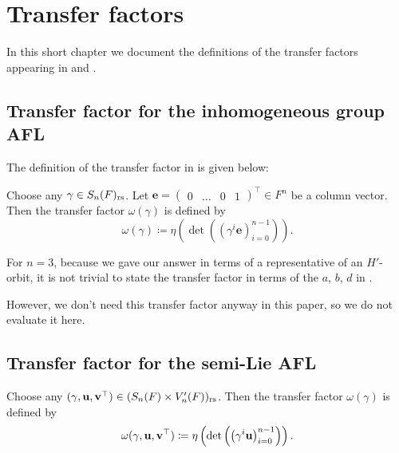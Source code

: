 \section{Transfer factors}
\label{ch:transf}

In this short chapter we document the definitions of the transfer
factors appearing in  and .

\subsection{Transfer factor for the inhomogeneous group AFL}
The definition of the transfer factor in  is given below:
\begin{definition}
  Choose any $\gamma \in S_n(F)_{\mathrm{rs}}$.
  Let $\mathbf{e} = \begin{pmatrix} 0 & \dots & 0 & 1 \end{pmatrix}^\top \in F^n$
  be a column vector.
  Then the transfer factor $\omega(\gamma)$ is defined by
  \[ \omega(\gamma) \coloneqq
    \eta\left( \det\left( \left( \gamma^i \mathbf{e} \right)_{i=0}^{n-1} \right) \right).
  \]
\end{definition}

For $n=3$, because we gave our answer in terms of a representative
of an $H'$-orbit, it is not trivial to state the transfer factor
in terms of the $a$, $b$, $d$ in .

However, we don't need this transfer factor anyway in this paper,
so we do not evaluate it here.

\subsection{Transfer factor for the semi-Lie AFL}
\begin{definition}
  Choose any ${(\gamma, \mathbf u, \mathbf v^\top)} \in (S_n(F) \times V'_n(F))_{\mathrm{rs}}$.
  Then the transfer factor $\omega(\gamma)$ is defined by
  \[ \omega{(\gamma, \mathbf u, \mathbf v^\top)} \coloneqq
    \eta\left( \det\left( \left( \gamma^i \mathbf u \right)_{i=0}^{n-1} \right) \right).
  \]
\end{definition}

